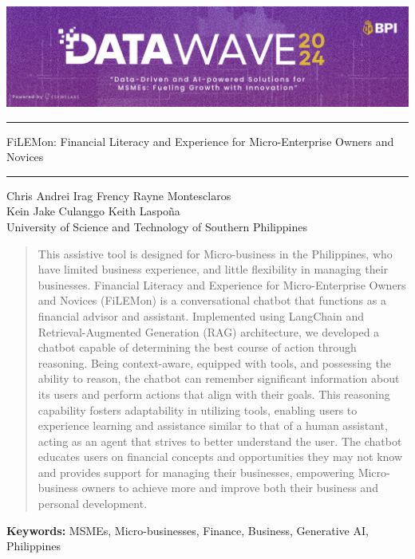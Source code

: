 \documentclass{article}
\date{}
\begin{document}
\begin{titlepage}
\centering
\includegraphics[width=15cm]{img.png} 

\vspace{1cm} %
\hrule height 1.5mm %
\vspace{1cm}
    \LARGE FiLEMon: Financial Literacy and Experience for Micro-Enterprise Owners and Novices
    \vspace{1cm}
    \hrule height 0.5mm %

\vspace{1cm}
    \normalsize Chris Andrei Irag \hspace{0.5cm}
    \normalsize Frency Rayne Montesclaros \vspace{0.2cm}  \\
    \normalsize Kein Jake Culanggo \hspace{0.3cm}
    \normalsize Keith Laspoña \vspace{0.3cm} \\    
    \centering University of Science and Technology of Southern Philippines
\vspace{0.5cm}
\begin{abstract} 
    \noindent 
This assistive tool is designed for Micro-business in the Philippines, who have limited business experience, and little flexibility in managing their businesses. Financial Literacy and Experience for Micro-Enterprise Owners and Novices (FiLEMon) is a conversational chatbot that functions as a financial advisor and assistant. Implemented using LangChain and Retrieval-Augmented Generation (RAG) architecture, we developed a chatbot capable of determining the best course of action through reasoning. Being context-aware, equipped with tools, and possessing the ability to reason, the chatbot can remember significant information about its users and perform actions that align with their goals. This reasoning capability fosters adaptability in utilizing tools, enabling users to experience learning and assistance similar to that of a human assistant, acting as an agent that strives to better understand the user. The chatbot educates users on financial concepts and opportunities they may not know and provides support for managing their businesses, empowering Micro-business owners to achieve more and improve both their business and personal development.

\end{abstract}
\vspace{0.5cm}

\textbf{Keywords:} MSMEs, Micro-businesses, Finance, Business, Generative AI, Philippines

\end{titlepage}
\end{document}
